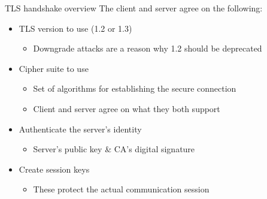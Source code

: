 \begin{frame}{TLS handshake overview}
  The client and server agree on the following:
  \begin{itemize}[<+(1)->]
    \item TLS version to use (1.2 or 1.3)
    \begin{itemize}
      \item Downgrade attacks are a reason why 1.2 should be deprecated
    \end{itemize}
    \item Cipher suite to use
    \begin{itemize}
      \item Set of algorithms for establishing the secure connection
      \item Client and server agree on what they both support
    \end{itemize}
    \item Authenticate the server's identity
    \begin{itemize}
      \item Server's public key \& CA's digital signature
    \end{itemize}
    \item Create session keys
    \begin{itemize}
      \item These protect the actual communication session
    \end{itemize}
  \end{itemize}
\end{frame}

